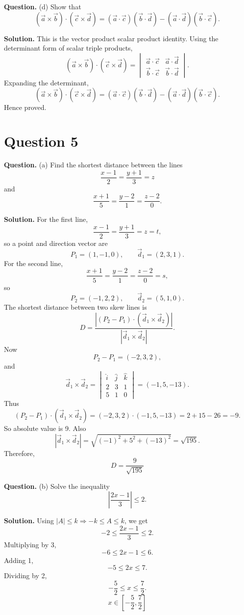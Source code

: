 \documentclass[11pt,a4paper]{article}
\newcommand{\question}[1]{\begin{questionbox}\textbf{Question.} #1\end{questionbox}}
\newcommand{\answer}{\begin{answerbox}\textbf{Solution.} }
\newcommand{\eanswer}{\end{answerbox}}
\newcommand{\finalans}[1]{\[\boxed{#1}\]}
\begin{document}
\question{(d) Show that
\[
(\vec a\times\vec b)\cdot(\vec c\times\vec d)=(\vec a\cdot\vec c)(\vec b\cdot\vec d)-(\vec a\cdot\vec d)(\vec b\cdot\vec c).
\]}
\answer
This is the vector product scalar product identity. Using the determinant form of scalar triple products,
\[
(\vec a\times\vec b)\cdot(\vec c\times\vec d)
=\begin{vmatrix}
\vec a\cdot\vec c & \vec a\cdot\vec d\\
\vec b\cdot\vec c & \vec b\cdot\vec d
\end{vmatrix}.
\]
Expanding the determinant,
\[
(\vec a\times\vec b)\cdot(\vec c\times\vec d)
=(\vec a\cdot\vec c)(\vec b\cdot\vec d)-(\vec a\cdot\vec d)(\vec b\cdot\vec c).
\]
Hence proved.
\eanswer

\section*{Question 5}

\question{(a) Find the shortest distance between the lines
\[
\frac{x-1}{2}=\frac{y+1}{3}=z
\]
and
\[
\frac{x+1}{5}=\frac{y-2}{1}=\frac{z-2}{0}.
\]}
\answer
For the first line,
\[
\frac{x-1}{2}=\frac{y+1}{3}=z=t,
\]
so a point and direction vector are
\[
P_1=(1,-1,0),\qquad \vec d_1=(2,3,1).
\]
For the second line,
\[
\frac{x+1}{5}=\frac{y-2}{1}=\frac{z-2}{0}=s,
\]
so
\[
P_2=(-1,2,2),\qquad \vec d_2=(5,1,0).
\]
The shortest distance between two skew lines is
\[
D=\frac{|(P_2-P_1)\cdot(\vec d_1\times\vec d_2)|}{|\vec d_1\times\vec d_2|}.
\]
Now
\[
P_2-P_1=(-2,3,2),
\]
and
\[
\vec d_1\times\vec d_2=
\begin{vmatrix}
\hat i&\hat j&\hat k\\
2&3&1\\
5&1&0
\end{vmatrix}=(-1,5,-13).
\]
Thus
\[
(P_2-P_1)\cdot(\vec d_1\times\vec d_2)=(-2,3,2)\cdot(-1,5,-13)=2+15-26=-9.
\]
So absolute value is 9. Also
\[
|\vec d_1\times\vec d_2|=\sqrt{(-1)^2+5^2+(-13)^2}=\sqrt{195}.
\]
Therefore,
\finalans{D=\frac{9}{\sqrt{195}}}
\eanswer

\question{(b) Solve the inequality
\[
\left|\frac{2x-1}{3}\right|\le2.
\]}
\answer
Using \(|A|\le k\Rightarrow -k\le A\le k\), we get
\[
-2\le \frac{2x-1}{3}\le 2.
\]
Multiplying by 3,
\[
-6\le 2x-1\le 6.
\]
Adding 1,
\[
-5\le 2x\le 7.
\]
Dividing by 2,
\[
-\frac52\le x\le \frac72.
\]
\finalans{x\in\left[-\frac52,\frac72\right]}
\begin{center}
\end{center}
\eanswer
\end{document}
